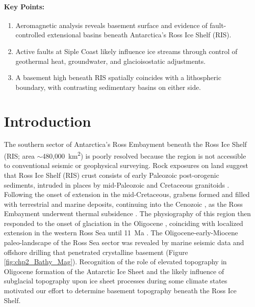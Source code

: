 \paragraph*{Key Points:}

\begin{enumerate}
    \item Aeromagnetic analysis reveals basement surface and evidence of fault-controlled extensional basins beneath Antarctica's Ross Ice Shelf (RIS).
    \item Active faults at Siple Coast likely influence ice streams through control of geothermal heat, groundwater, and glacioisostatic adjustments.
    \item A basement high beneath RIS spatially coincides with a lithospheric boundary, with contrasting sedimentary basins on either side.
\end{enumerate}


\section{Introduction} \label{chp2:intro}

The southern sector of Antarctica's Ross Embayment beneath the Ross Ice Shelf (RIS; area $\sim$480,000~km\textsuperscript{2}) is poorly resolved because the region is not accessible to conventional seismic or geophysical surveying. Rock exposures on land suggest that Ross Ice Shelf (RIS) crust consists of early Paleozoic post-orogenic sediments, intruded in places by mid-Paleozoic and Cretaceous granitoids \citep{luyendykeastern2003, goodgegeological2020}. Following the onset of extension in the mid-Cretaceous, grabens formed and filled with terrestrial and marine deposits, continuing into the Cenozoic \citep[e.g.][]{sorlienoligocene2007, coenenpaleogene2019}, as the Ross Embayment underwent thermal subsidence \citep{karnergravity2005, wilsonwest2009}. The physiography of this region then responded to the onset of glaciation in the Oligocene \citep{paxmanreconstructions2019}, coinciding with localized extension in the western Ross Sea until 11~Ma \citep{granotlate2018}. The Oligocene-early-Miocene paleo-landscape of the Ross Sea sector was revealed by marine seismic data \citep[e.g.][]{brancolinidescriptive1995, pérezearly2021} and offshore drilling that penetrated crystalline basement \citep[DSDP Site 270;][]{fordbasement1975} (Figure \ref{fig:chp2_Bathy_Mag}). Recognition of the role of elevated topography in Oligocene formation of the Antarctic Ice Sheet \citep{decontocoupled2003, wilsoninitiation2013} and the likely influence of subglacial topography upon ice sheet processes during some climate states \citep{austermannimpact2015, colleonicontinental2018} motivated our effort to determine basement topography beneath the Ross Ice Shelf.\\

